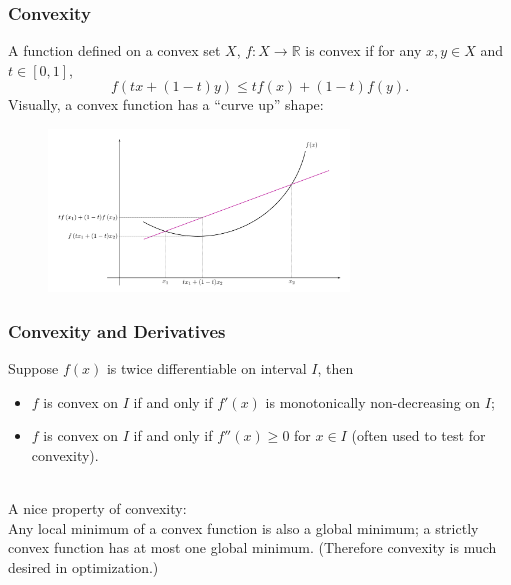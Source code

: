 \documentclass{beamer}
\begin{document}
\begin{frame}
\frametitle{Convexity}
A function defined on a convex set $X$, $f: X \rightarrow \mathbb{R}$ is convex if for any $x,y \in X$ and $t \in [0,1]$, 
$$
f(tx+(1-t)y) \leq tf(x) + (1-t)f(y).
$$
Visually, a convex function has a ``curve up'' shape:
\begin{figure}
\centering
\includegraphics[width=8cm]{Convex-Function.png}
\end{figure}

\end{frame}

\begin{frame}
\frametitle{Convexity and Derivatives}
Suppose $f(x)$ is twice differentiable on interval $I$, then
\begin{itemize}
\item $f$ is convex on $I$ if and only if $f'(x)$ is monotonically non-decreasing on $I$;
\item $f$ is convex on $I$ if and only if $f''(x) \geq 0$ for $x \in I$  (often used to test for convexity).
\end{itemize}
~\\
A nice property of convexity:\\
Any local minimum of a convex function is also a global minimum; a strictly convex function has at most one global minimum. (Therefore convexity is much desired in optimization.)

\end{frame}
\end{document}
